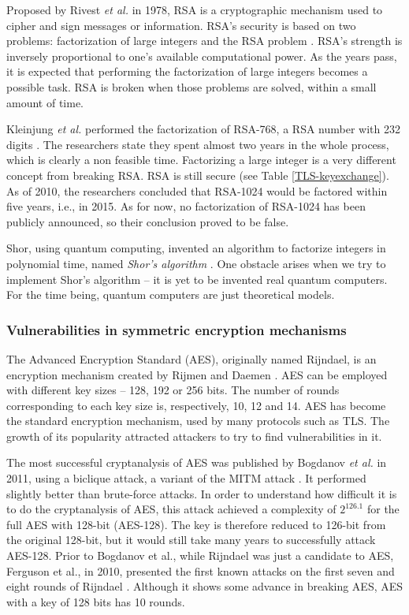 \documentclass{sig-alternate-05-2015}
\begin{document}
Proposed by Rivest \textit{et al.} in 1978, RSA is a cryptographic mechanism used to cipher and sign messages or information. RSA's security is based on two problems: factorization of large integers and the RSA problem \cite{Menezes1996}. RSA's strength is inversely proportional to one's available computational power. As the years pass, it is expected that performing the factorization of large integers becomes a possible task.
RSA is broken when those problems are solved, within a small amount of time.

Kleinjung \textit{et al.} performed the factorization of RSA-768, a RSA number with 232 digits \cite{Kleinjung2010}. The researchers state they spent almost two years in the whole process, which is clearly a non feasible time.
Factorizing a large integer is a very different concept from breaking RSA. RSA is still secure (see Table \ref{TLS-keyexchange}).
As of 2010, the researchers concluded that RSA-1024 would be factored within five years, i.e., in 2015. As for now, no factorization of RSA-1024 has been publicly announced, so their conclusion proved to be false.

Shor, using quantum computing, invented an algorithm to factorize integers in polynomial time, named \textit{Shor's algorithm} \cite{Shor1995}. One obstacle arises when we try to implement Shor's algorithm -- it is yet to be invented real quantum computers. For the time being, quantum computers are just theoretical models.

\subsubsection{Vulnerabilities in symmetric encryption mechanisms}

The Advanced Encryption Standard (AES), originally named Rijndael, is an encryption mechanism created by Rijmen and Daemen \cite{Rijmen2001}. AES can be employed with different key sizes -- 128, 192 or 256 bits. The number of rounds corresponding to each key size is, respectively, 10, 12 and 14.
AES has become the standard encryption mechanism, used by many protocols such as TLS. The growth of its popularity attracted attackers to try to find vulnerabilities in it.

The most successful cryptanalysis of AES was published by Bogdanov \textit{et al.} in 2011, using a biclique attack, a variant of the MITM attack \cite{Bogdanov2011}. It performed slightly better than brute-force attacks. In order to understand how difficult it is to do the cryptanalysis of AES, this attack achieved a complexity of $2^{126.1}$ for the full AES with 128-bit (AES-128). The key is therefore reduced to 126-bit from the original 128-bit, but it would still take many years to successfully attack AES-128.
Prior to Bogdanov et al., while Rijndael was just a candidate to AES, Ferguson et al., in 2010, presented the first known attacks on the first seven and eight rounds of Rijndael \cite{Ferguson2001}. Although it shows some advance in breaking AES, AES with a key of 128 bits has 10 rounds.
\end{document}
